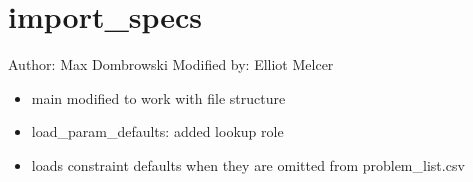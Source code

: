 \documentclass[a4paper,11pt,german]{sphinxmanual}
\begin{document}
\begin{fulllineitems}
\begin{fulllineitems}
\label{\detokenize{api/ioh_core:core.ioh_core.cache_eval.EvalContext.get}}
\pysigstartsignatures
\pysiglinewithargsret
{}
{}
{}
\pysigstopsignatures
\end{fulllineitems}


\begin{fulllineitems}
\label{\detokenize{api/ioh_core:core.ioh_core.cache_eval.EvalContext.reset}}
\pysigstartsignatures
\pysiglinewithargsret
{}
{}
{}
\pysigstopsignatures
\end{fulllineitems}


\end{fulllineitems}



\section{import\_specs}
\label{\detokenize{api/ioh_core:module-core.ioh_core.import_specs}}\label{\detokenize{api/ioh_core:import-specs}}
\sphinxAtStartPar
Author: Max Dombrowski
Modified by: Elliot Melcer
\begin{itemize}
\item {} 
\sphinxAtStartPar
main modified to work with file structure

\item {} 
\sphinxAtStartPar
load\_param\_defaults: added lookup role

\item {} 
\sphinxAtStartPar
loads constraint defaults when they are omitted from problem\_list.csv

\end{itemize}
\end{document}

